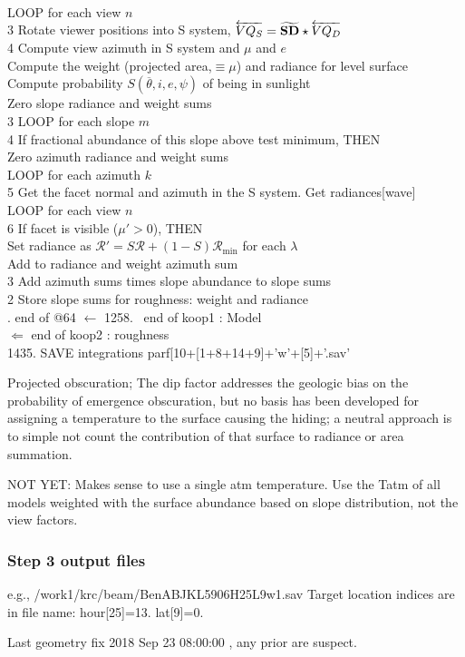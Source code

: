 \documentclass{article}
\newcommand{\qh}[1]{\\ \hspace*{#1.em} #1 \hspace*{0.4em} } %
\newcommand{\qH}[1]{\\ \hspace*{#1.em}  \hspace*{1.3em} } %
\begin{document}
\qH{2} LOOP for each view $n$ %
\qh{3} Rotate viewer positions into S system, $\overleftarrow{VQ_S} = \widetilde {\mathbf{ SD }} \star  \overleftarrow{VQ_D}$
\qh{4} Compute view azimuth in S system  and $\mu$  and $e$ %
\qH{4} Compute the weight (projected area,$ \equiv \mu$) and radiance for level surface %
\qH{4} Compute probability $S( \overline{\theta},i,e,\psi)$ of being in sunlight
\qH{4} Zero slope radiance  and weight sums
\qh{3} LOOP for each slope $m$  %
\qh{4} If fractional abundance of this slope above test minimum, THEN 
\qH{3} Zero azimuth radiance and weight sums 
\qH{4} LOOP for each azimuth $k$ %
\qh{5} Get the facet normal and azimuth in the S system. Get radiances[wave] %
\qH{5} LOOP for each view $n$
\qh{6} If facet is visible ($\mu'>0$), THEN  
\qH{6} Set radiance as $\mathcal{R}' = S \mathcal{R} + (1-S) \mathcal{R_\mathrm{min}}$ for each $\lambda $
\qH{6} Add to radiance and weight azimuth sum %
\qh{3} Add azimuth sums times slope abundance to slope sums  %
\qh{2} Store slope sums for roughness:  weight and radiance %
\\ . \hrulefill end of @64 \hrulefill \hspace{3.in}
\qi $\longleftarrow$ 1258. \ end of koop1 : Model
\\ $\Longleftarrow$    end of koop2 : roughness
\\ 1435. SAVE  integrations parf[10+[1+8+14+9]+'w'+[5]+'.sav'

\vspace{3mm} Projected obscuration; The dip factor addresses the geologic bias
on the probability of emergence obscuration, but no basis has been developed for
assigning a temperature to the surface causing the hiding; a neutral approach is
to simple not count the contribution of that surface to radiance or area
summation.

\vspace{3mm} NOT YET: Makes sense to use a single atm temperature. Use the Tatm
of all models weighted with the surface abundance based on slope distribution,
not the view factors.

\subsubsection{Step 3 output files} %
e.g., /work1/krc/beam/BenABJKL5906H25L9w1.sav
\qi Target location indices are in file name: hour[25]=13. lat[9]=0. 

Last geometry fix  2018 Sep 23 08:00:00 , any prior are suspect.
 
\end{document}
